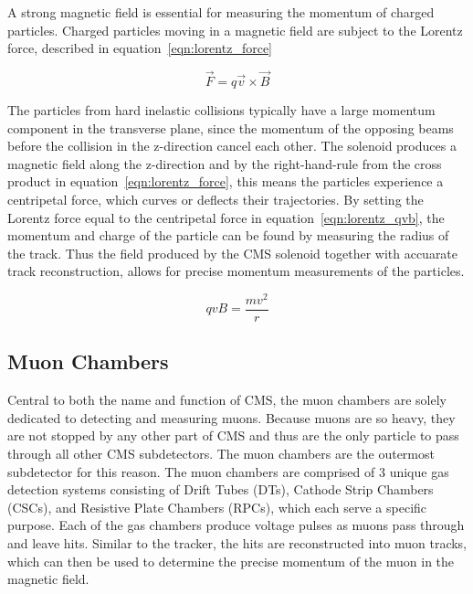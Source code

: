 A strong magnetic field is essential for measuring the momentum of charged particles. Charged particles moving in a magnetic field are subject to the Lorentz force, described in
equation~\ref{eqn:lorentz_force} 

\begin{equation}
\label{eqn:lorentz_force}
 \vec{F} = q\vec{v} \times \vec{B}
\end{equation}

The particles from hard inelastic collisions typically have a large momentum component in the transverse plane, since the momentum of the opposing beams before the collision in the z-direction cancel each other.
The solenoid produces a magnetic field along the z-direction and by the right-hand-rule from the cross product in equation~\ref{eqn:lorentz_force}, this means the particles experience a centripetal force, which
curves or deflects their trajectories. By setting the Lorentz force equal to the centripetal force in equation~\ref{eqn:lorentz_qvb}, the momentum and charge of the particle can be found by measuring the radius of the track. 
Thus the field produced by the CMS solenoid together with accuarate track reconstruction, allows for precise momentum measurements of the particles.

\begin{equation}
\label{eqn:lorentz_qvb}
 qvB = \frac{mv^{2}}{r}
\end{equation}

\subsection{Muon Chambers}
Central to both the name and function of CMS, the muon chambers are solely dedicated to detecting and measuring muons.
Because muons are so heavy, they are not stopped by any other part of CMS and thus are the only particle to pass through all other CMS subdetectors.
The muon chambers are the outermost subdetector for this reason. The muon chambers are comprised of 3 unique gas detection systems consisting of Drift Tubes (DTs),
Cathode Strip Chambers (CSCs), and Resistive Plate Chambers (RPCs), which each serve a specific purpose. Each of the gas chambers produce voltage pulses as muons pass through and leave hits.
Similar to the tracker, the hits are reconstructed into muon tracks, which can then be used to determine the precise momentum of the muon in the magnetic field.  


